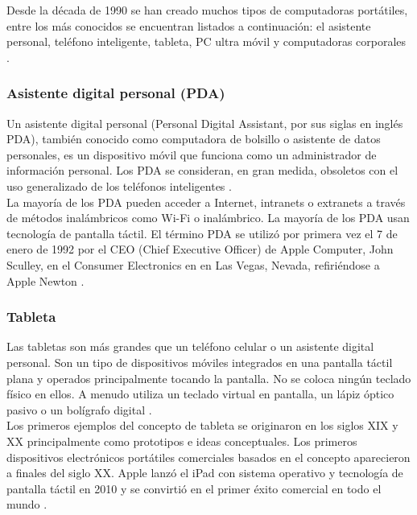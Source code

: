 Desde la década de 1990 se han creado muchos tipos de computadoras portátiles, entre los más conocidos se encuentran listados a continuación: el asistente personal, teléfono inteligente, tableta, PC ultra móvil y computadoras corporales \cite{MBPDO}. \\

\subsubsection{Asistente digital personal (PDA) }

Un asistente digital personal (Personal Digital Assistant, por sus siglas en inglés PDA), también conocido como computadora de bolsillo o asistente de datos personales, es un dispositivo móvil que funciona como un administrador de información personal. Los PDA se consideran, en gran medida, obsoletos con el uso generalizado de los teléfonos inteligentes \cite{MBPDA}. \\

La mayoría de los PDA pueden acceder a Internet, intranets o extranets a través de métodos inalámbricos como Wi-Fi o inalámbrico. La mayoría de los PDA usan tecnología de pantalla táctil. El término PDA se utilizó por primera vez el 7 de enero de 1992 por el CEO (Chief Executive Officer) de Apple Computer, John Sculley, en el Consumer Electronics en en Las Vegas, Nevada, refiriéndose a Apple Newton \cite{MBPDA2}. \\


\subsubsection{Tableta}

Las tabletas son más grandes que un teléfono celular o un asistente digital personal. Son un tipo de dispositivos móviles integrados en una pantalla táctil plana y operados principalmente tocando la pantalla. No se coloca ningún teclado físico en ellos. A menudo utiliza un teclado virtual en pantalla, un lápiz óptico pasivo o un bolígrafo digital \cite{MBPDO}. \\
 
Los primeros ejemplos del concepto de tableta se originaron en los siglos XIX y XX principalmente como prototipos e ideas conceptuales. Los primeros dispositivos electrónicos portátiles comerciales basados en el concepto aparecieron a finales del siglo XX. Apple lanzó el iPad con sistema operativo y tecnología de pantalla táctil en 2010 y se convirtió en el primer éxito comercial en todo el mundo \cite{MBPDO}. \\

